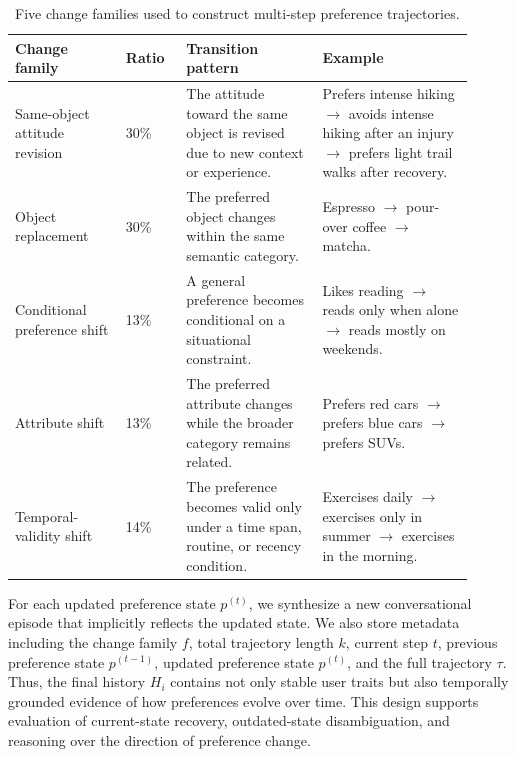 \documentclass{article}
\begin{document}
\begin{table}[t]
\centering
\small
\begin{tabular}{p{0.22\linewidth}p{0.12\linewidth}p{0.27\linewidth}p{0.30\linewidth}}
\toprule
\textbf{Change family} & \textbf{Ratio} & \textbf{Transition pattern} & \textbf{Example} \\
\midrule
Same-object attitude revision
& 30\%
& The attitude toward the same object is revised due to new context or experience.
& Prefers intense hiking $\rightarrow$ avoids intense hiking after an injury $\rightarrow$ prefers light trail walks after recovery. \\

Object replacement
& 30\%
& The preferred object changes within the same semantic category.
& Espresso $\rightarrow$ pour-over coffee $\rightarrow$ matcha. \\

Conditional preference shift
& 13\%
& A general preference becomes conditional on a situational constraint.
& Likes reading $\rightarrow$ reads only when alone $\rightarrow$ reads mostly on weekends. \\

Attribute shift
& 13\%
& The preferred attribute changes while the broader category remains related.
& Prefers red cars $\rightarrow$ prefers blue cars $\rightarrow$ prefers SUVs. \\

Temporal-validity shift
& 14\%
& The preference becomes valid only under a time span, routine, or recency condition.
& Exercises daily $\rightarrow$ exercises only in summer $\rightarrow$ exercises in the morning. \\
\bottomrule
\end{tabular}
\caption{Five change families used to construct multi-step preference trajectories.}
\label{tab:persona_mem_evo_change_families}
\end{table}

For each updated preference state $p^{(t)}$, we synthesize a new conversational episode that implicitly reflects the updated state. We also store metadata including the change family $f$, total trajectory length $k$, current step $t$, previous preference state $p^{(t-1)}$, updated preference state $p^{(t)}$, and the full trajectory $\tau$. Thus, the final history $H_i$ contains not only stable user traits but also temporally grounded evidence of how preferences evolve over time. This design supports evaluation of current-state recovery, outdated-state disambiguation, and reasoning over the direction of preference change.
\end{document}
